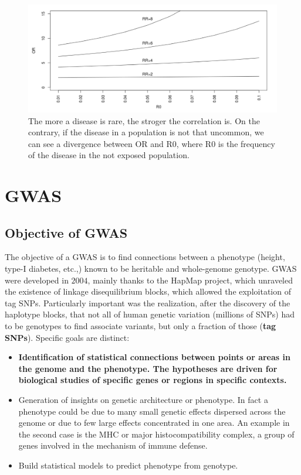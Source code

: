 		\begin{figure}[H]
		\centering
		\includegraphics[scale=0.2]{divergence}
		\caption{The more a disease is rare, the stroger the correlation is. On the contrary, if the disease in a population is not that uncommon, we can see a divergence between OR and R0, where R0 is the frequency of the disease in the not exposed population.}
		\label{fig:divergence}
		\end{figure}



\section{GWAS}
	\subsection{Objective of GWAS}
	The objective of a GWAS is to find connections between a phenotype (height, type-I diabetes, etc.,) known to be heritable and whole-genome genotype.
	GWAS were developed in $2004$, mainly thanks to the HapMap project, which unraveled the existence of linkage disequilibrium blocks, which allowed the exploitation of tag SNPs.
	Particularly important was the realization, after the discovery of the haplotype blocks, that not all of human genetic variation (millions of SNPs) had to be genotypes to find associate variants, but  only a fraction of those (\textbf{tag SNPs}).
	Specific goals are distinct:

		\begin{itemize}
			\item \textbf{Identification of statistical connections between points or areas in the genome and the phenotype.
				The hypotheses are driven for biological studies of specific genes or regions in specific contexts.}
			\item Generation of insights on genetic architecture or phenotype.
				In fact a phenotype could be due to many small genetic effects dispersed across the genome or due to few large effects concentrated in one area.
				An example in the second case is the MHC or major histocompatibility complex, a group of genes involved in the mechanism of immune defense.
			\item Build statistical models to predict phenotype from genotype.
		\end{itemize}


